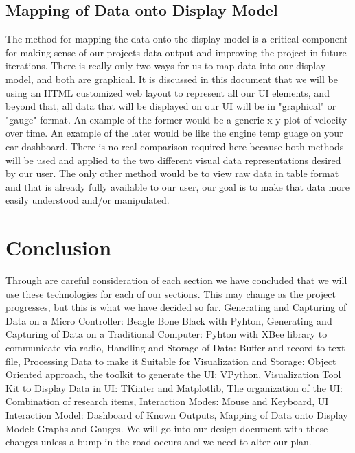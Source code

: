\documentclass[10pt,draftclsnofoot,onecolumn]{IEEEtran}
\begin{document}
\subsection{Mapping of Data onto Display Model}
The method for mapping the data onto the display model is a critical component for making sense of our projects data output and improving the project in future iterations. There is really only two ways for us to map data into our display model, and both are graphical. It is discussed in this document that we will be using an HTML customized web layout to represent all our UI elements, and beyond that, all data that will be displayed on our UI will be in "graphical" or "gauge" format. An example of the former would be a generic x y plot of velocity over time. An example of the later would be like the engine temp guage on your car dashboard. There is no real comparison required here because both methods will be used and applied to the two different visual data representations desired by our user. The only other method would be to view raw data in table format and that is already fully available to our user, our goal is to make that data more easily understood and/or manipulated.\par

\section{Conclusion}
Through are careful consideration of each section we have concluded that we will use these technologies for each of our sections. This may change as the project progresses, but this is what we have decided so far. Generating and Capturing of Data on a Micro Controller: Beagle Bone Black with Pyhton, Generating and Capturing of Data on a Traditional Computer: Pyhton with XBee library to communicate via radio, Handling and Storage of Data: Buffer and record to text file, Processing Data to make it Suitable for Visualization and Storage: Object Oriented approach, the toolkit to generate the UI: VPython, Visualization Tool Kit to Display Data in UI: TKinter and Matplotlib, The organization of the UI: Combination of research items, Interaction Modes: Mouse and Keyboard, UI Interaction Model: Dashboard of Known Outputs, Mapping of Data onto Display Model: Graphs and Gauges. We will go into our design document with these changes unless a bump in the road occurs and we need to alter our plan.
\end{document}
